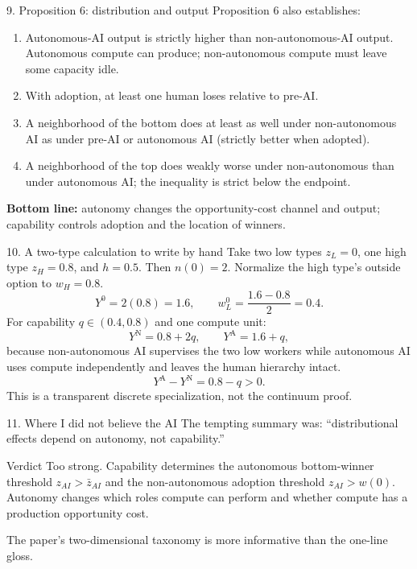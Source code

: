 \documentclass[aspectratio=169,11pt]{beamer}
\newcommand{\A}{\mathrm{A}}
\newcommand{\N}{\mathrm{N}}
\begin{document}
\begin{frame}{9. Proposition 6: distribution and output}
Proposition 6 also establishes:
\begin{enumerate}
\item Autonomous-AI output is strictly higher than non-autonomous-AI output.
      Autonomous compute can produce; non-autonomous compute must leave some
      capacity idle.
\item With adoption, at least one human loses relative to pre-AI.
\item A neighborhood of the bottom does at least as well under non-autonomous
      AI as under pre-AI or autonomous AI (strictly better when adopted).
\item A neighborhood of the top does weakly worse under non-autonomous than
      under autonomous AI; the inequality is strict below the endpoint.
\end{enumerate}
\textbf{Bottom line:} autonomy changes the opportunity-cost channel and output;
capability controls adoption and the location of winners.
\end{frame}

\begin{frame}{10. A two-type calculation to write by hand}
Take two low types $z_L=0$, one high type $z_H=0.8$, and $h=0.5$. Then
$n(0)=2$. Normalize the high type's outside option to $w_H=0.8$.
\[
Y^0=2(0.8)=1.6,\qquad w_L^0=\frac{1.6-0.8}{2}=0.4.
\]
For capability $q\in(0.4,0.8)$ and one compute unit:
\[
Y^\N=0.8+2q,\qquad Y^\A=1.6+q,
\]
because non-autonomous AI supervises the two low workers while autonomous AI
uses compute independently and leaves the human hierarchy intact.
\[
Y^\A-Y^\N=0.8-q>0.
\]
This is a transparent discrete specialization, not the continuum proof.
\end{frame}

\begin{frame}{11. Where I did not believe the AI}
The tempting summary was: “distributional effects depend on autonomy, not
capability.”

\begin{alertblock}{Verdict}
Too strong. Capability determines the autonomous bottom-winner threshold
$z_{AI}>\bar z_{AI}$ and the non-autonomous adoption threshold
$z_{AI}>w(0)$. Autonomy changes which roles compute can perform and whether
compute has a production opportunity cost.
\end{alertblock}

The paper's two-dimensional taxonomy is more informative than the one-line
gloss.
\end{frame}
\end{document}
